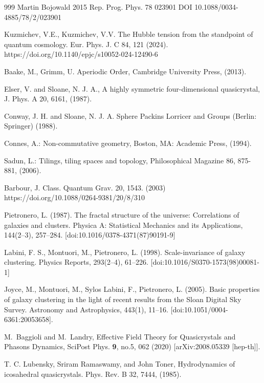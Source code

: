 \documentclass[sn-mathphys-num]{sn-jnl}%
\begin{document}
\begin{thebibliography}{999}
     Martin Bojowald 2015 Rep. Prog. Phys. 78 023901
     DOI 10.1088/0034-4885/78/2/023901
    
     Kuzmichev, V.E., Kuzmichev, V.V. The Hubble tension from the standpoint of quantum cosmology. Eur. Phys. J. C 84, 121 (2024). https://doi.org/10.1140/epjc/s10052-024-12490-6

 	Baake, M., Grimm, U. Aperiodic Order, Cambridge University Press, (2013).

    Elser, V. and Sloane, N. J. A., A highly symmetric four-dimensional quasicrystal, J. Phys. A 20, 6161, (1987).

     Conway, J. H. and Sloane, N. J. A. Sphere Packins Lorricer and Groups (Berlin: Springer) (1988).

  Connes, A.: Non-commutative geometry, Boston, MA: Academic Press, (1994).

	Sadun, L.: Tilings, tiling spaces and topology, Philosophical Magazine 86, 875-881, (2006). 

    Barbour, J. Class. Quantum Grav. 20, 1543. (2003)
    https://doi.org/10.1088/0264-9381/20/8/310
    
    Pietronero, L. (1987). The fractal structure of the universe: Correlations of galaxies and clusters. Physica A: Statistical Mechanics and its Applications, 144(2–3), 257–284. [doi:10.1016/0378-4371(87)90191-9]

    Labini, F. S., Montuori, M.,  Pietronero, L. (1998). Scale-invariance of galaxy clustering. Physics Reports, 293(2–4), 61–226. [doi:10.1016/S0370-1573(98)00081-1]

    Joyce, M., Montuori, M., Sylos Labini, F.,  Pietronero, L. (2005). Basic properties of galaxy clustering in the light of recent results from the Sloan Digital Sky Survey. Astronomy and Astrophysics, 443(1), 11–16. [doi:10.1051/0004-6361:20053658].

    M.~Baggioli and M.~Landry,
    Effective Field Theory for Quasicrystals and Phasons Dynamics,
    SciPost Phys. \textbf{9}, no.5, 062 (2020)
    [arXiv:2008.05339 [hep-th]].

    T. C. Lubensky, Sriram Ramaswamy, and John Toner, Hydrodynamics of icosahedral quasicrystals. Phys. Rev. B 32, 7444, (1985).


\end{thebibliography}
\end{document}
